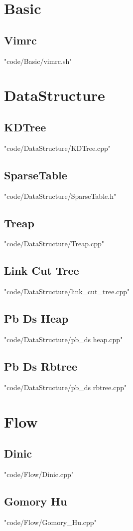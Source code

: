 


\section{Basic}
\subsection{Vimrc}
 {"code/Basic/vimrc.sh"}
\section{DataStructure}
\subsection{KDTree}
 {"code/DataStructure/KDTree.cpp"}
\subsection{SparseTable}
 {"code/DataStructure/SparseTable.h"}
\subsection{Treap}
 {"code/DataStructure/Treap.cpp"}
\subsection{Link Cut Tree}
 {"code/DataStructure/link_cut_tree.cpp"}
\subsection{Pb Ds Heap}
 {"code/DataStructure/pb_ds heap.cpp"}
\subsection{Pb Ds Rbtree}
 {"code/DataStructure/pb_ds rbtree.cpp"}
\section{Flow}
\subsection{Dinic}
 {"code/Flow/Dinic.cpp"}
\subsection{Gomory Hu}
 {"code/Flow/Gomory_Hu.cpp"}
